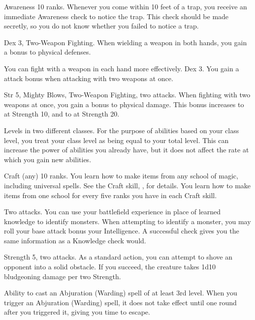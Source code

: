 \featpre Awareness 10 ranks.
\featben Whenever you come within 10 feet of a trap, you receive an immediate Awareness check to notice the trap.
This check should be made secretly, so you do not know whether you failed to notice a trap.

\featpres Dex 3, Two-Weapon Fighting.
\featben When wielding a weapon in both hands, you gain a  bonus to physical defenses.

You can fight with a weapon in each hand more effectively.
\featpre Dex 3.
\featben You gain a  attack bonus when attacking with two weapons at once.

\featpres Str 5, Mighty Blows, Two-Weapon Fighting, two attacks.
\featben When fighting with two weapons at once, you gain a  bonus to physical damage.
This bonus increases to  at Strength 10, and to  at Strength 20.

\featpre Levels in two different classes.
\featben For the purpose of abilities based on your class level, you treat your class level as being equal to your total level.
This can increase the power of abilities you already have, but it does not affect the rate at which you gain new abilities.

\featpre Craft (any) 10 ranks.
\featben You learn how to make items from any school of magic, including universal spells.
See the Craft skill, , for details.
You learn how to make items from one school for every five ranks you have in each Craft skill.

\featpre Two attacks.
\featben You can use your battlefield experience in place of learned knowledge to identify monsters.
When attempting to identify a monster, you may roll your base attack bonus \add your Intelligence.
A successful check gives you the same information as a Knowledge check would.

\featpres Strength 5, two attacks.
\featben As a standard action, you can attempt to shove an opponent into a solid obstacle.
If you succeed, the creature takes 1d10 bludgeoning damage per two Strength.

\featpre Ability to cast an Abjuration (Warding) spell of at least 3rd level.
\featben When you trigger an Abjuration (Warding) spell, it does not take effect until one round after you triggered it, giving you time to escape.

